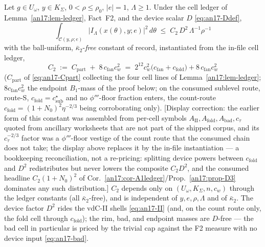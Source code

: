 \begin{theorem}
\label{an17:thm-D3fibre}
Let $g\in U_\omega$, $y\in K_\Sigma$, $0<\rho\le\rho_0$, $|e|=1$, $\Lambda\ge1$.
Under the cell ledger of Lemma~\ref{an17:lem-ledger}, Fact~F2, and the device
scalar $D$ \eqref{eq:an17-Ddef},
\begin{equation}\label{eq:an17-D3fibre}
 \boxed{\;\int_{\mathcal C(y,\rho;e)}\bigl|I_\Lambda(x(\theta),y;e)\bigr|^{2}
 \,d\theta\;\le\;C_2\,D^{2}\,\Lambda^{-1}\rho^{-1}\;}
\end{equation}
with the ball-uniform, $\bar\kappa_2$-\emph{free} constant of record, instantiated
from the in-file cell ledger,
\begin{equation}\label{eq:an17-C2}
 C_2\;:=\;C_{\mathrm{part}}\;+\;8\,c_{\mathrm{fan}}c_w^2
 \;=\;2^{12}c_w^2\bigl(c_{\mathrm{fan}}+c_{\mathrm{fold}}\bigr)
 +8\,c_{\mathrm{fan}}c_w^2
\end{equation}
($C_{\mathrm{part}}$ of \eqref{eq:an17-Cpart} collecting the four cell lines of
Lemma~\ref{an17:lem-ledger}; $8c_{\mathrm{fan}}c_w^2$ the endpoint $B_1$-mass of
the proof below; on the consumed sublevel route, route-S,
$c_{\mathrm{fold}}=c_{\mathrm{sub}}^\star$ and no $\phi'''$-floor fraction
enters, the count-route $c_{\mathrm{fold}}=(1+N_0)^2\eta^{-2/3}$ being
corroborating only). \textup{[Display correction: the earlier form of this
constant was assembled from per-cell symbols
$A_{\mathrm{II}},A_{\mathrm{fold}},A_{\mathrm{bad}},c_\tau$ quoted from ancillary
worksheets that are not part of the shipped corpus, and its $c_\tau^{-2/3}$
factor was a $\phi'''$-floor vestige of the count route that the consumed chain
does not take; the display above replaces it by the in-file instantiation --- a
bookkeeping reconciliation, not a re-pricing: splitting device powers between
$c_{\mathrm{fold}}$ and $D^2$ redistributes but never lowers the composite
$C_2D^2$, and the consumed headline $C_2(1+N_0)^2$ of
Cor.~\ref{an17:cor-A1ledger}/Prop.~\ref{an17:prop-D3} dominates any such
distribution.]} $C_2$ depends only on $(U_\omega,K_\Sigma,n,c_w)$ through the
ledger constants {\rm(}all $\bar\kappa_2$-free{\rm)}, and is independent of
$y,e,\rho,\Lambda$ and of $\bar\kappa_2$. The device factor $D^2$ rides the
vdC-II shells \eqref{eq:an17-II} (and, on the count route only, the fold cell
through $c_{\mathrm{fold}}$); the rim, bad, and endpoint masses are $D$-free ---
the bad cell in particular is priced by the trivial cap against the F2 measure
with no device input \eqref{eq:an17-bad}.
\end{theorem}
